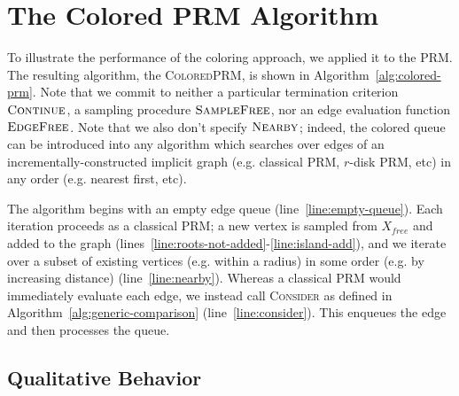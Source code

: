 \section{The Colored PRM Algorithm}
\label{sec:colored-prm}

To illustrate the performance of the coloring approach,
we applied it to the PRM.
The resulting algorithm, the \textsc{ColoredPRM},
is shown in Algorithm~\ref{alg:colored-prm}.
Note that we commit to
neither a particular termination criterion $\mbox{\textsc{Continue}}$,
a sampling procedure $\mbox{\textsc{SampleFree}}$,
nor an edge evaluation function $\mbox{\textsc{EdgeFree}}$.
Note that we also don't specify $\mbox{\textsc{Nearby}}$;
indeed, the colored queue can be introduced into any algorithm
which searches over edges of an incrementally-constructed implicit graph
(e.g. classical PRM, $r$-disk PRM, etc)
in any order (e.g. nearest first, etc).

The algorithm begins with an empty edge queue
(line~\ref{line:empty-queue}).
Each iteration proceeds as a classical PRM;
a new vertex is sampled from $X_{free}$ and added to the graph
(lines~\ref{line:roots-not-added}-\ref{line:island-add}),
and we iterate over a subset of existing vertices
(e.g. within a radius) in some order (e.g. by increasing distance)
(line~\ref{line:nearby}).
Whereas a classical PRM would immediately evaluate each edge,
we instead call \textsc{Consider} as defined in
Algorithm~\ref{alg:generic-comparison} (line~\ref{line:consider}).
This enqueues the edge and then processes the queue.

\subsection{Qualitative Behavior}

